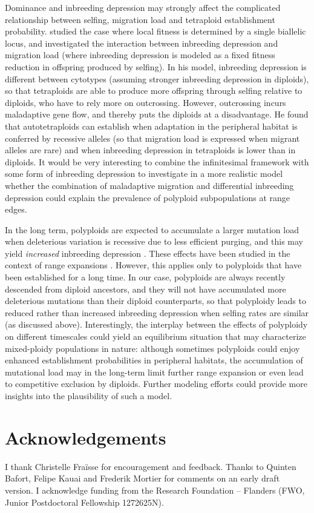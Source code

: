 \documentclass[12pt,a4paper]{article}
\begin{document}
Dominance and inbreeding depression may strongly affect the complicated
relationship between selfing, migration load and tetraploid establishment
probability.
\cite{griswold2021} studied the case where local fitness is determined by a
single biallelic locus, and investigated the interaction between inbreeding
depression and migration load (where inbreeding depression is modeled as a
fixed fitness reduction in offspring produced by selfing).
In his model, inbreeding depression is different between cytotypes (assuming
stronger inbreeding depression in diploids), so that tetraploids are able to
produce more offspring through selfing relative to diploids, who have to rely
more on outcrossing.
However, outcrossing incurs maladaptive gene flow, and thereby puts the
diploids at a disadvantage. 
He found that autotetraploids can establish when adaptation in the
peripheral habitat is conferred by recessive alleles (so that migration load is
expressed when migrant alleles are rare) and when inbreeding depression in
tetraploids is lower than in diploids.
It would be very interesting to combine the infinitesimal framework with some
form of inbreeding depression to investigate in a more realistic model whether
the combination of maladaptive migration and differential inbreeding depression
could explain the prevalence of polyploid subpopulations at range edges.

In the long term, polyploids are expected to accumulate a larger
mutation load when deleterious variation is recessive due to less efficient
purging, and this may yield \textit{increased} inbreeding depression
\citep{vlcek2025biorxiv}.
These effects have been studied in the context of range expansions
\citep{booker2024}.
However, this applies only to polyploids that have been established for a long
time.
In our case, polyploids are always recently descended from diploid ancestors,
and they will not have accumulated more deleterious mutations than their
diploid counterparts, so that polyploidy leads to reduced rather than increased
inbreeding depression when selfing rates are similar (as discussed above).
Interestingly, the interplay between the effects of polyploidy on different
timescales could yield an equilibrium situation that may characterize
mixed-ploidy populations in nature: although sometimes polyploids could enjoy
enhanced establishment probabilities in peripheral habitats, the accumulation
of mutational load may in the long-term limit further range expansion or
even lead to competitive exclusion by diploids.
Further modeling efforts could provide more insights into the plausibility of
such a model.


\section*{Acknowledgements}

I thank Christelle Fraïsse for encouragement and feedback. Thanks to Quinten
Bafort, Felipe Kauai and Frederik Mortier for comments on an early draft
version.
I acknowledge funding from the Research Foundation -- Flanders (FWO, Junior
Postdoctoral Fellowship 1272625N).



\end{document}
